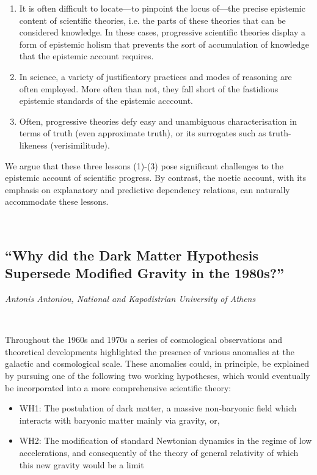 \documentclass[11pt]{article}
\begin{document}
\begin{enumerate}
    \item It is often difficult to locate—to pinpoint the locus of—the precise epistemic content of
scientific theories, i.e. the parts of these theories that can be considered knowledge. In
these cases, progressive scientific theories display a form of epistemic holism that
prevents the sort of accumulation of knowledge that the epistemic account requires.
\item  In science, a variety of justificatory practices and modes of reasoning are often
employed. More often than not, they fall short of the fastidious epistemic standards of
the epistemic acccount.
\item  Often, progressive theories defy easy and unambiguous characterisation in terms of
truth (even approximate truth), or its surrogates such as truth-likeness (verisimilitude).

\end{enumerate}

We argue that these three lessons (1)-(3) pose significant challenges to the epistemic account
of scientific progress. By contrast, the noetic account, with its emphasis on explanatory and
predictive dependency relations, can naturally accommodate these lessons.

\

\subsection*{\textsf{``Why did the Dark Matter
Hypothesis Supersede Modified
Gravity in the 1980s?''}}

\textcolor{moderncvgreen}{
\textit{Antonis Antoniou, National and Kapodistrian University of Athens
}
}

\

Throughout the 1960s and 1970s a series of cosmological observations and theoretical developments
highlighted the presence of various anomalies at the galactic and cosmological scale. These anomalies
could, in principle, be explained by pursuing one of the following two working hypotheses, which
would eventually be incorporated into a more comprehensive scientific theory:

\begin{itemize}
    \item WH1: The postulation of dark matter, a massive non-baryonic field which interacts with baryonic matter mainly via gravity, or,
    \item WH2: The modification of standard Newtonian dynamics in the regime of low accelerations,
and consequently of the theory of general relativity of which this new gravity would be a limit
\end{itemize}
\end{document}
